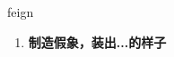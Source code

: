 
\begin{frame}
{\huge feign}
\begin{center}
\begin{enumerate}\Large
  \item \textbf{制造假象，装出...的样子}
\end{enumerate}
\end{center}
\end{frame}
